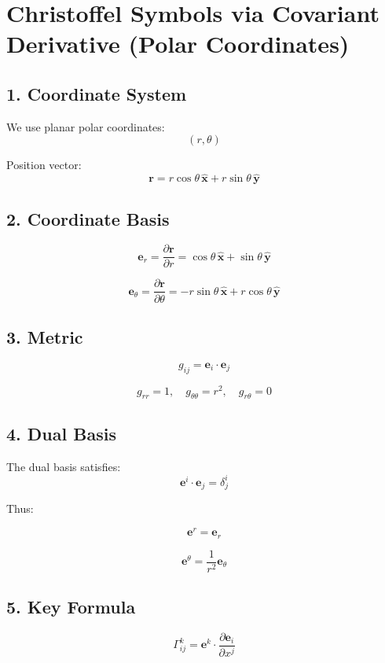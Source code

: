 \documentclass{article}
\begin{document}
	
	\section*{Christoffel Symbols via Covariant Derivative (Polar Coordinates)}
	
	\subsection*{1. Coordinate System}
	
	We use planar polar coordinates:
	\[
	(r,\theta)
	\]
	
	Position vector:
	\[
	\mathbf{r} = r\cos\theta\,\hat{\mathbf{x}} + r\sin\theta\,\hat{\mathbf{y}}
	\]
	
	\subsection*{2. Coordinate Basis}
	
	\[
	\mathbf{e}_r = \frac{\partial \mathbf{r}}{\partial r}
	= \cos\theta\,\hat{\mathbf{x}} + \sin\theta\,\hat{\mathbf{y}}
	\]
	
	\[
	\mathbf{e}_\theta = \frac{\partial \mathbf{r}}{\partial \theta}
	= -r\sin\theta\,\hat{\mathbf{x}} + r\cos\theta\,\hat{\mathbf{y}}
	\]
	
	\subsection*{3. Metric}
	
	\[
	g_{ij} = \mathbf{e}_i \cdot \mathbf{e}_j
	\]
	
	\[
	g_{rr} = 1, \quad g_{\theta\theta} = r^2, \quad g_{r\theta}=0
	\]
	
	\subsection*{4. Dual Basis}
	
	The dual basis satisfies:
	\[
	\mathbf{e}^i \cdot \mathbf{e}_j = \delta^i_j
	\]
	
	Thus:
	
	\[
	\mathbf{e}^r = \mathbf{e}_r
	\]
	
	\[
	\mathbf{e}^\theta = \frac{1}{r^2}\mathbf{e}_\theta
	\]
	
	\subsection*{5. Key Formula}
	
	\[
	\Gamma^k_{ij}
	=
	\mathbf{e}^k \cdot \frac{\partial \mathbf{e}_i}{\partial x^j}
	\]
	
\end{document}
